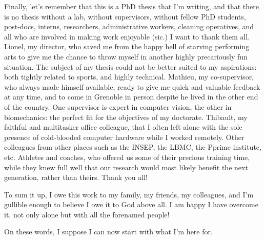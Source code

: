 Finally, let's remember that this is a PhD thesis that I'm writing, and that there is no thesis without a lab, without supervisors, without fellow PhD students, post-docs, interns, researchers, administrative workers, cleaning operatives, and all who are involved in making work enjoyable (sic.) I want to thank them all. Lionel, my director, who saved me from the happy hell of starving performing arts to give me the chance to throw myself in another highly precariously fun situation. The subject of my thesis could not be better suited to my aspirations: both tightly related to sports, and highly technical. Mathieu, my co-supervisor, who always made himself available, ready to give me quick and valuable feedback at any time, and to come in Grenoble in person despite he lived in the other end of the country. One supervisor is expert in computer vision, the other in biomechanics: the perfect fit for the objectives of my doctorate. Thibault, my faithful and multitasker office colleague, that I often left alone with the sole presence of cold-blooded computer hardware while I worked remotely. Other colleagues from other places such as the INSEP, the LBMC, the Pprime institute, etc. Athletes and coaches, who offered us some of their precious training time, while they knew full well that our research would most likely benefit the next generation, rather than theirs. Thank you all!

To sum it up, I owe this work to my family, my friends, my colleagues, and I'm gullible enough to believe I owe it to God above all. I am happy I have overcome it, not only alone but with all the forenamed people!

On these words, I suppose I can now start with what I'm here for.
